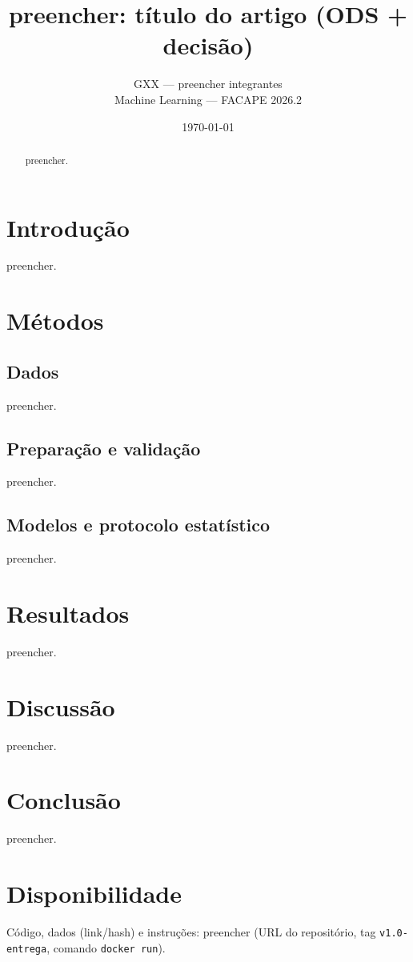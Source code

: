 \documentclass[11pt,a4paper]{article}
\title{preencher: título do artigo (ODS + decisão)}
\author{GXX --- preencher integrantes \\ Machine Learning --- FACAPE 2026.2}
\date{\today}
\begin{document}
\maketitle

\begin{abstract}
preencher.
\end{abstract}

\section{Introdução}
preencher.

\section{Métodos}
\subsection{Dados}
preencher.

\subsection{Preparação e validação}
preencher.

\subsection{Modelos e protocolo estatístico}
preencher.

\section{Resultados}
% 
preencher.

\section{Discussão}
preencher.

\section{Conclusão}
preencher.

\section*{Disponibilidade}
Código, dados (link/hash) e instruções: preencher (URL do repositório, tag
\texttt{v1.0-entrega}, comando \texttt{docker run}).



\end{document}
